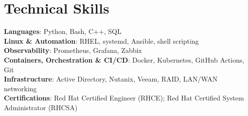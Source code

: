 \documentclass[letterpaper,11pt]{article}
\begin{document}
\section{Technical Skills}
 \begin{itemize}[leftmargin=0.15in, label={}]
    \small{\item{
     \textbf{Languages}{: Python, Bash, C++, SQL} \\
     \textbf{Linux \& Automation}{: RHEL, systemd, Ansible, shell scripting} \\
     \textbf{Observability}{: Prometheus, Grafana, Zabbix} \\
     \textbf{Containers, Orchestration \& CI/CD}{: Docker, Kubernetes, GitHub Actions, Git} \\
     \textbf{Infrastructure}{: Active Directory, Nutanix, Veeam, RAID, LAN/WAN networking} \\
     \textbf{Certifications}{: Red Hat Certified Engineer (RHCE); Red Hat Certified System Administrator (RHCSA)}
    }}
 \end{itemize}
\end{document}
